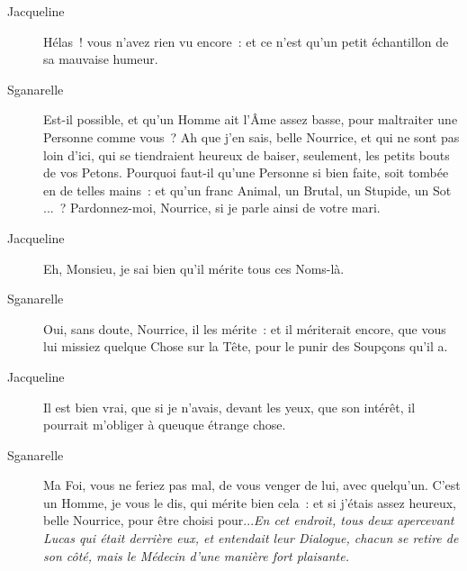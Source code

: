 \documentclass[french,twoside]{book} %
\begin{document}
 \begin{description} \item[Jacqueline] 

Hélas ! vous n’avez rien vu encore : et ce n’est qu’un petit échantillon de sa mauvaise humeur.\end{description}
 \begin{description} \item[Sganarelle] 

Est-il possible, et qu’un Homme ait l’Âme assez basse, pour maltraiter une Personne comme vous ? Ah que j’en sais, belle Nourrice, et qui ne sont pas loin d’ici, qui se tiendraient heureux de baiser, seulement, les petits bouts de vos Petons. Pourquoi faut-il qu’une Personne si bien faite, soit tombée en de telles mains : et qu’un franc Animal, un Brutal, un Stupide, un Sot ... ? Pardonnez-moi, Nourrice, si je parle ainsi de votre mari.\end{description}
 \begin{description} \item[Jacqueline] 

Eh, Monsieu, je sai bien qu’il mérite tous ces Noms-là.\end{description}
 \begin{description} \item[Sganarelle] 

Oui, sans doute, Nourrice, il les mérite : et il mériterait encore, que vous lui missiez quelque Chose sur la Tête, pour le punir des Soupçons qu’il a.\end{description}
 \begin{description} \item[Jacqueline] 

Il est bien vrai, que si je n’avais, devant les yeux, que son intérêt, il pourrait m’obliger à queuque étrange chose.\end{description}
 \begin{description} \item[Sganarelle] 

Ma Foi, vous ne feriez pas mal, de vous venger de lui, avec quelqu’un. C’est un Homme, je vous le dis, qui mérite bien cela : et si j’étais assez heureux, belle Nourrice, pour être choisi pour...\textit{En cet endroit, tous deux apercevant Lucas qui était derrière eux, et entendait leur Dialogue, chacun se retire de son côté, mais le Médecin d’une manière fort plaisante.} \end{description}
\end{document}
